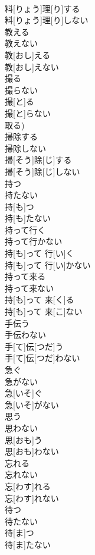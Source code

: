 \documentclass[8pt]{extreport}
\begin{document}
\begin{CJK}{UTF8}{min}
\\	料[りょう]理[り]する 
\\	料[りょう]理[り]しない
\\	教える 
\\	教えない	
\\	教[おし]える 
\\	教[おし]えない
\\	撮る 
\\	撮らない	
\\	撮[と]る 
\\	撮[と]らない 
\\	取る)
\\	掃除する 
\\	掃除しない	
\\	掃[そう]除[じ]する 
\\	掃[そう]除[じ]しない
\\	持つ 
\\	持たない	
\\	持[も]つ 
\\	持[も]たない
\\	持って行く 
\\	持って行かない	
\\	持[も]って 行[い]く 
\\	持[も]って 行[い]かない
\\	持って来る 
\\	持って来ない	
\\	持[も]って 来[く]る 
\\	持[も]って 来[こ]ない
\\	手伝う 
\\	手伝わない	
\\	手[て]伝[つだ]う 
\\	手[て]伝[つだ]わない
\\	急ぐ 
\\	急がない	
\\	急[いそ]ぐ 
\\	急[いそ]がない
\\	思う 
\\	思わない	
\\	思[おも]う 
\\	思[おも]わない
\\	忘れる 
\\	忘れない	
\\	忘[わす]れる 
\\	忘[わす]れない
\\	待つ 
\\	待たない	
\\	待[ま]つ 
\\	待[ま]たない

\end{CJK}
\end{document}
